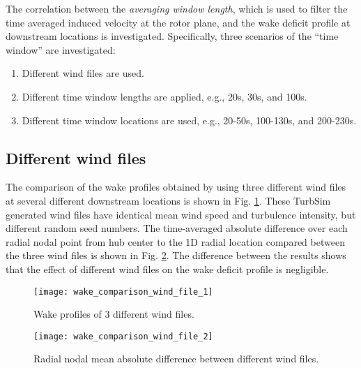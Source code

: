 \documentclass{umthesis}
\begin{document}
The correlation between the \emph{averaging window length}, which is used to filter the time averaged induced velocity at the rotor plane, and the wake deficit profile at downstream locations is investigated. Specifically, three scenarios of the “time window” are investigated:
\begin{enumerate}
  \item Different wind files are used.
  \item Different time window lengths are applied, e.g., 20s, 30s, and 100s.
  \item Different time window locations are used, e.g., 20-50s, 100-130s, and 200-230s.
\end{enumerate}

\subsection{Different wind files}
The comparison of the wake profiles obtained by using three different wind files at several different downstream locations is shown in Fig. \ref{fig:wake_comparison_wind_file_1}. These TurbSim generated wind files have identical mean wind speed and turbulence intensity, but different random seed numbers. The time-averaged absolute difference over each radial nodal point from hub center to the 1D radial location compared between the three wind files is shown in Fig. \ref{fig:wake_comparison_wind_file_2}. The difference between the results shows that the effect of different wind files on the wake deficit profile is negligible.
\begin{figure}
  \centering
  \texttt{[image: wake\_comparison\_wind\_file\_1]}
  \caption{Wake profiles of 3 different wind files.}\label{fig:wake_comparison_wind_file_1}
\end{figure}
\begin{figure}
  \centering
  \texttt{[image: wake\_comparison\_wind\_file\_2]}
  \caption{Radial nodal mean absolute difference between different wind files.}\label{fig:wake_comparison_wind_file_2}
\end{figure}
\end{document}
